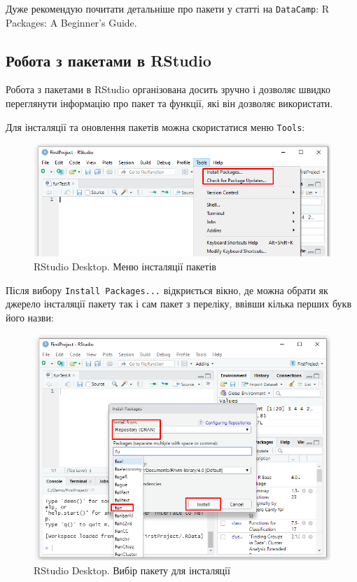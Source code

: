 \documentclass[
]{book}
\begin{document}
Дуже рекомендую почитати детальніше про пакети у статті на \texttt{DataCamp}:
R Packages: A Beginner's Guide.

\hypertarget{chapter142}{%
\subsection{Робота з пакетами в RStudio}\label{chapter142}}

Робота з пакетами в RStudio організована досить зручно і дозволяє швидко переглянути інформацію про пакет та функції, які він дозволяє використати.

Для інсталяції та оновлення пакетів можна скористатися меню \texttt{Tools}:

\begin{figure}
\centering
\includegraphics{images/chapter1/packages_1.png}
\caption{\label{fig:unnamed-chunk-31}RStudio Desktop. Меню інсталяції пакетів}
\end{figure}

Після вибору \texttt{Install\ Packages...} відкриється вікно, де можна обрати як джерело інсталяції пакету так і сам пакет з переліку, ввівши кілька перших букв його назви:

\begin{figure}
\centering
\includegraphics{images/chapter1/packages_2.png}
\caption{\label{fig:unnamed-chunk-32}RStudio Desktop. Вибір пакету для інсталяції}
\end{figure}
\end{document}
